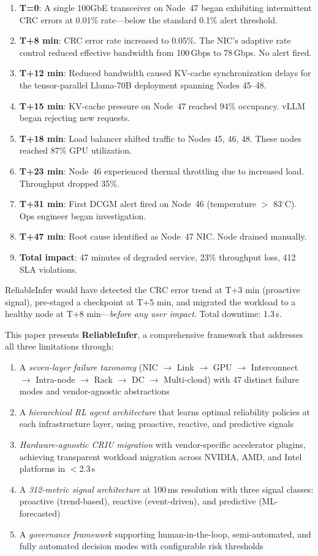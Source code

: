 \documentclass[conference,10pt,letterpaper]{IEEEtran}
\begin{document}
\begin{enumerate}
\item \textbf{T=0}: A single 100GbE transceiver on Node~47 began exhibiting intermittent CRC errors at 0.01\% rate---below the standard 0.1\% alert threshold.
\item \textbf{T+8 min}: CRC error rate increased to 0.05\%. The NIC's adaptive rate control reduced effective bandwidth from 100\,Gbps to 78\,Gbps. No alert fired.
\item \textbf{T+12 min}: Reduced bandwidth caused KV-cache synchronization delays for the tensor-parallel Llama-70B deployment spanning Nodes 45--48.
\item \textbf{T+15 min}: KV-cache pressure on Node~47 reached 94\% occupancy. vLLM began rejecting new requests.
\item \textbf{T+18 min}: Load balancer shifted traffic to Nodes 45, 46, 48. These nodes reached 87\% GPU utilization.
\item \textbf{T+23 min}: Node~46 experienced thermal throttling due to increased load. Throughput dropped 35\%.
\item \textbf{T+31 min}: First DCGM alert fired on Node~46 (temperature $>$ 83$^\circ$C). Ops engineer began investigation.
\item \textbf{T+47 min}: Root cause identified as Node~47 NIC. Node drained manually.
\item \textbf{Total impact}: 47 minutes of degraded service, 23\% throughput loss, 412 SLA violations.
\end{enumerate}

ReliableInfer would have detected the CRC error trend at T+3 min (proactive signal), pre-staged a checkpoint at T+5 min, and migrated the workload to a healthy node at T+8 min---\emph{before any user impact}. Total downtime: 1.3\,s.

This paper presents \textbf{ReliableInfer}, a comprehensive framework that addresses all three limitations through:
\begin{enumerate}
\item A \emph{seven-layer failure taxonomy} (NIC $\to$ Link $\to$ GPU $\to$ Interconnect $\to$ Intra-node $\to$ Rack $\to$ DC $\to$ Multi-cloud) with 47 distinct failure modes and vendor-agnostic abstractions
\item A \emph{hierarchical RL agent architecture} that learns optimal reliability policies at each infrastructure layer, using proactive, reactive, and predictive signals
\item \emph{Hardware-agnostic CRIU migration} with vendor-specific accelerator plugins, achieving transparent workload migration across NVIDIA, AMD, and Intel platforms in $<$2.3\,s
\item A \emph{312-metric signal architecture} at 100\,ms resolution with three signal classes: proactive (trend-based), reactive (event-driven), and predictive (ML-forecasted)
\item A \emph{governance framework} supporting human-in-the-loop, semi-automated, and fully automated decision modes with configurable risk thresholds
\end{enumerate}
\end{document}
